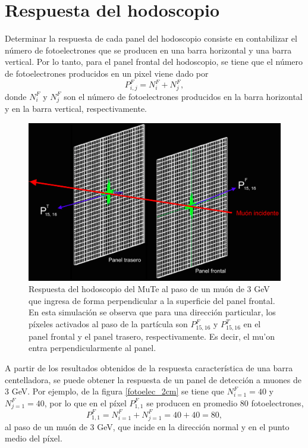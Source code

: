 \documentclass[12pt,oneside,openany,letter]{book}
\begin{document}

\section{Respuesta del hodoscopio}\label{section_hodoscopio}
Determinar la respuesta de cada panel del hodoscopio consiste en contabilizar el número de fotoelectrones que se producen en una barra horizontal y una barra vertical. Por lo tanto, para el panel frontal del hodoscopio, se tiene que el n\'umero de fotoelectrones producidos en un pixel viene dado por 
\begin{equation}
\label{n_FE}
P^{F}_{i,j}=N^{F}_{i}+N^{F}_{j},
\end{equation}
donde $N^{F}_{i}$ y $N^{F}_j$ son el n\'umero de fotoelectrones producidos en la barra horizontal y en la barra vertical, respectivamente.
\begin{figure}[h!]
    \centering
        \includegraphics[scale=0.42]{panel_geant4.png}
   \caption[Respuesta del hodoscopio del MuTe simulado en Geant4]{Respuesta del hodoscopio del MuTe al paso de un muón de 3 GeV que ingresa de forma perpendicular a la superficie del panel frontal. En esta simulaci\'on se observa que para una dirección particular, los píxeles activados al paso de la partícula son $P^{F}_{15,16}$ y $P^{T}_{15,16}$ en el panel frontal y el panel trasero, respectivamente. Es decir, el mu'on entra perpendicularmente al panel.}\label{panel_geant4}
\end{figure}

A partir de los resultados obtenidos de la respuesta característica de una barra centelladora, se puede obtener la respuesta de un panel de detección a muones de 3 GeV. Por ejemplo, de la figura \ref{fotoelec_2cm} se tiene que $N^{F}_{i=1}=40$ y $N^{F}_{j=1}=40$, por lo que en el píxel $P^{F}_{1,1}$ se producen en promedio 80 fotoelectrones,
\begin{equation}
P^{F}_{1,1}=N^{F}_{i=1}+N^{F}_{j=1} = 40+40=80,
\end{equation}
al paso de un muón de 3 GeV, que incide en la dirección normal y en el punto medio del píxel. 
\end{document}
